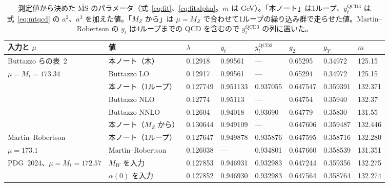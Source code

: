 \documentclass[a4paper,10pt]{ltjsarticle}
\newcommand{\MSbar}{\overline{\mathrm{MS}}}
\begin{document}
\begin{table}[tbp]
\centering\footnotesize\setlength{\tabcolsep}{4.5pt}
\caption{測定値から決めた $\MSbar$ のパラメータ（式~\eqref{eq:fit}、\eqref{eq:fitalpha}。$m$ は GeV）。「本ノート」は1ループ、$y_t^{\mathrm{QCD3}}$ は式~\eqref{eq:mtqcd} の $a^2$、$a^3$ を加えた値。「$M_Z$ から」は $\mu=M_Z$ で合わせて1ループの繰り込み群で走らせた値。Martin--Robertson の $y_t$ は4ループまでの QCD を含むので $y_t^{\mathrm{QCD3}}$ の列に置いた。}
\label{tab:fit}
\begin{tabular}{llllllll}
\toprule
入力と $\mu$ & 値 & $\lambda$ & $y_t$ & $y_t^{\mathrm{QCD3}}$ & $g_2$ & $g_Y$ & $m$ \\
\midrule
Buttazzo らの表~2 & 本ノート（木） & 0.12918 & 0.99561 & — & 0.65295 & 0.34972 & 125.15 \\
$\mu=M_t=173.34$ & Buttazzo LO & 0.12917 & 0.99561 & — & 0.65294 & 0.34972 & 125.15 \\
 & 本ノート（1ループ） & 0.127749 & 0.951133 & 0.937055 & 0.647547 & 0.359391 & 132.371 \\
 & Buttazzo NLO & 0.12774 & 0.95113 & — & 0.64754 & 0.35940 & 132.37 \\
 & Buttazzo NNLO & 0.12604 & 0.94018 & 0.93690 & 0.64779 & 0.35830 & 131.55 \\
 & 本ノート（$M_Z$ から） & 0.130644 & 0.949109 & — & 0.647606 & 0.359487 & 132.446 \\
\midrule
Martin--Robertson & 本ノート（1ループ） & 0.127647 & 0.949878 & 0.935876 & 0.647595 & 0.358716 & 132.280 \\
$\mu=173.1$ & Martin--Robertson & 0.126038 & — & 0.934801 & 0.647660 & 0.358539 & 131.351 \\
\midrule
PDG~2024、$\mu=M_t=172.57$ & $M_W$ を入力 & 0.127853 & 0.946931 & 0.932983 & 0.647244 & 0.359356 & 132.275 \\
 & $\alpha(0)$ を入力 & 0.127852 & 0.946930 & 0.932983 & 0.647564 & 0.358764 & 132.274 \\
\bottomrule
\end{tabular}
\end{table}
\end{document}
